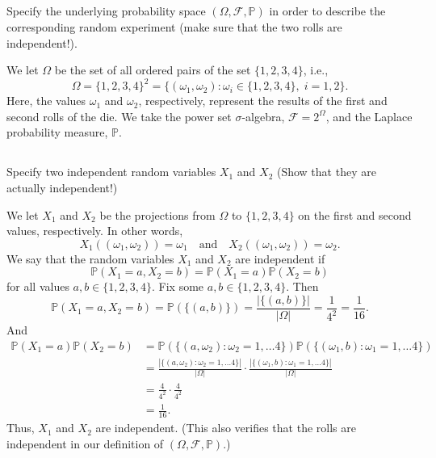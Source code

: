 \documentclass[12pt]{article}
\newenvironment{problem}
    {\begin{lrbox}{\mybox}\begin{minipage}{0.98\textwidth}}
    {\end{minipage}\end{lrbox}\framebox[\textwidth]{\usebox{\mybox}}}
\newcommand{\isp}[1]{\quad\text{#1}\quad}
\renewcommand{\P}{\mathbb{P}}
\newcommand{\FF}{\mathcal{F}}
\begin{document}
\subsection{}
\begin{problem}
    Specify the underlying probability space $(\Omega, \FF, \P)$ in order to describe the corresponding random experiment (make sure that the two rolls are independent!).
\end{problem}
\medskip

We let $\Omega$ be the set of all ordered pairs of the set $\{1, 2, 3, 4\}$, i.e.,
\[
    \Omega = \{1, 2, 3, 4\}^2 = \{(\omega_1, \omega_2) : \omega_i \in \{1, 2, 3, 4\},\; i = 1, 2\}.
\]
Here, the values $\omega_1$ and $\omega_2$, respectively, represent the results of the first and second rolls of the die. We take the power set $\sigma$-algebra, $\FF = 2^{\Omega}$, and the Laplace probability measure, $\P$.

\subsection{}
\begin{problem}
    Specify two independent random variables $X_1$ and $X_2$ (Show that they are actually independent!)
\end{problem}
\medskip

We let $X_1$ and $X_2$ be the projections from $\Omega$ to $\{1, 2, 3, 4\}$ on the first and second values, respectively. In other words,
\[
    X_1((\omega_1, \omega_2)) = \omega_1 \isp{and} X_2((\omega_1, \omega_2)) = \omega_2.
\]
We say that the random variables $X_1$ and $X_2$ are independent if
\[
    \P(X_1 = a, X_2 = b) = \P(X_1 = a)\P(X_2 = b)
\]
for all values $a, b \in \{1, 2, 3, 4\}$. Fix some $a, b \in \{1, 2, 3, 4\}$. Then
\[
    \P(X_1 = a, X_2 = b) = \P(\{(a,b)\}) = \frac{|\{(a,b)\}|}{|\Omega|} = \frac{1}{4^2} = \frac{1}{16}.
\]
And
\begin{align*}
    \P(X_1 = a)\P(X_2 = b)
        &= \P(\{(a, \omega_2) : \omega_2 = 1, \dots 4\})\P(\{(\omega_1, b) : \omega_1 = 1, \dots 4\}) \\[1em]
        &= \frac{|\{(a, \omega_2) : \omega_2 = 1, \dots 4\}|}{|\Omega|} \cdot \frac{|\{(\omega_1, b) : \omega_1 = 1, \dots 4\}|}{|\Omega|} \\
        &= \frac{4}{4^2} \cdot \frac{4}{4^2} \\
        &= \frac{1}{16}.
\end{align*}
Thus, $X_1$ and $X_2$ are independent. (This also verifies that the rolls are independent in our definition of $(\Omega, \FF, \P)$.)
\end{document}
